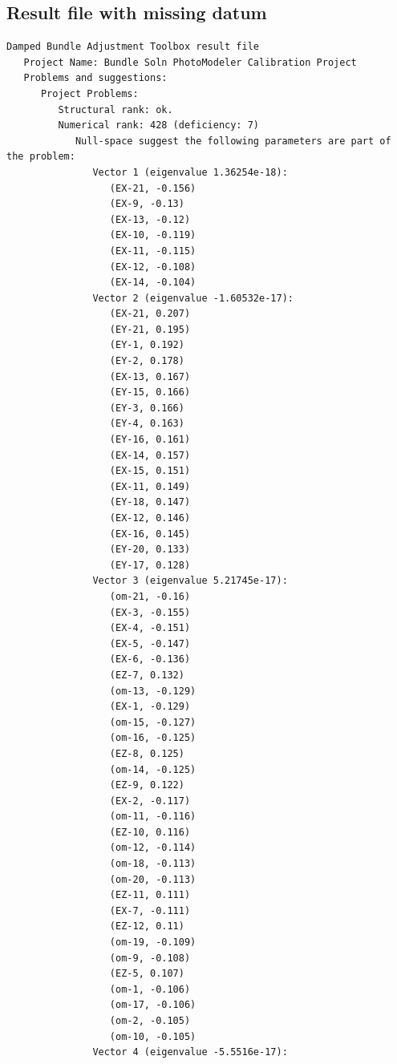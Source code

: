 \documentclass{article}
\begin{document}
\subsection{Result file with missing datum}
\label{sec:missingDatumResultFile}
\begin{verbatim}
Damped Bundle Adjustment Toolbox result file
   Project Name: Bundle Soln PhotoModeler Calibration Project
   Problems and suggestions:
      Project Problems:
         Structural rank: ok.
         Numerical rank: 428 (deficiency: 7)
            Null-space suggest the following parameters are part of the problem:
               Vector 1 (eigenvalue 1.36254e-18):
                  (EX-21, -0.156)
                  (EX-9, -0.13)
                  (EX-13, -0.12)
                  (EX-10, -0.119)
                  (EX-11, -0.115)
                  (EX-12, -0.108)
                  (EX-14, -0.104)
               Vector 2 (eigenvalue -1.60532e-17):
                  (EX-21, 0.207)
                  (EY-21, 0.195)
                  (EY-1, 0.192)
                  (EY-2, 0.178)
                  (EX-13, 0.167)
                  (EY-15, 0.166)
                  (EY-3, 0.166)
                  (EY-4, 0.163)
                  (EY-16, 0.161)
                  (EX-14, 0.157)
                  (EX-15, 0.151)
                  (EX-11, 0.149)
                  (EY-18, 0.147)
                  (EX-12, 0.146)
                  (EX-16, 0.145)
                  (EY-20, 0.133)
                  (EY-17, 0.128)
               Vector 3 (eigenvalue 5.21745e-17):
                  (om-21, -0.16)
                  (EX-3, -0.155)
                  (EX-4, -0.151)
                  (EX-5, -0.147)
                  (EX-6, -0.136)
                  (EZ-7, 0.132)
                  (om-13, -0.129)
                  (EX-1, -0.129)
                  (om-15, -0.127)
                  (om-16, -0.125)
                  (EZ-8, 0.125)
                  (om-14, -0.125)
                  (EZ-9, 0.122)
                  (EX-2, -0.117)
                  (om-11, -0.116)
                  (EZ-10, 0.116)
                  (om-12, -0.114)
                  (om-18, -0.113)
                  (om-20, -0.113)
                  (EZ-11, 0.111)
                  (EX-7, -0.111)
                  (EZ-12, 0.11)
                  (om-19, -0.109)
                  (om-9, -0.108)
                  (EZ-5, 0.107)
                  (om-1, -0.106)
                  (om-17, -0.106)
                  (om-2, -0.105)
                  (om-10, -0.105)
               Vector 4 (eigenvalue -5.5516e-17):

\end{verbatim}
\end{document}

